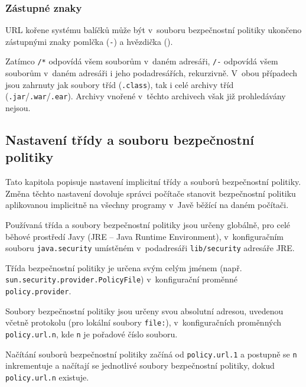 \subsubsection{Zástupné znaky}

URL kořene systému balíčků může být v~souboru bezpečnostní politiky ukončeno zástupnými znaky pomlčka ({\tt -}) a hvězdička ({\tt *}).

Zatímco {\tt /*} odpovídá všem souborům v~daném adresáři, {\tt /-} odpovídá všem souborům v~daném adresáři i jeho podadresářích, rekurzivně.
V~obou případech jsou zahrnuty jak soubory tříd ({\tt .class}), tak i celé archivy tříd ({\tt .jar}/{\tt .war}/{\tt .ear}).
Archivy vnořené v~těchto archivech však již prohledávány nejsou.
\cite{jdkdocPolicyFiles}

\subsection{Nastavení třídy a souboru bezpečnostní politiky} \label{nastaveniPolitiky}

Tato kapitola popisuje nastavení implicitní třídy a souborů bezpečnostní politiky. Změna těchto nastavení dovoluje správci počítače
stanovit bezpečnostní politiku aplikovanou implicitně na všechny programy v~Javě běžící na daném počítači.

Používaná třída a soubory bezpečnostní politiky jsou určeny globálně, pro celé běhové prostředí Javy (JRE -- Java Runtime Environment),
v~konfiguračním souboru {\tt java.security} umístěném v~podadresáři {\tt lib/security} adresáře JRE. \cite{refPolicyFiles}

Třída bezpečnostní politiky je určena svým celým jménem (např. {\tt sun.security.provider{\linebreak}.PolicyFile}) v~konfigurační proměnné {\tt policy.provider}. \cite{refPolicyFiles}

Soubory bezpečnostní politiky jsou určeny svou absolutní adresou, uvedenou včetně protokolu (pro lokální soubory {\tt file:}),
v~konfiguračních proměnných {\tt policy.url.n}, kde {\tt n} je pořadové číslo souboru. \cite{refPolicyFiles}

Načítání souborů bezpečnostní politiky začíná od {\tt policy.url.1} a postupně se {\tt n} inkrementuje a načítají se jednotlivé soubory bezpečnostní politiky,
dokud {\tt policy.url.n} existuje. \cite{refPolicyFiles}

